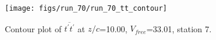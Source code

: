 \begin{figure}[H]
\centering
\texttt{[image: figs/run\_70/run\_70\_tt\_contour]}
\caption{Contour plot of $\overline{t^\prime t^\prime}$ at $z/c$=10.00, $V_{free}$=33.01, station 7.}
\label{fig:run_70_tt_contour}
\end{figure}


